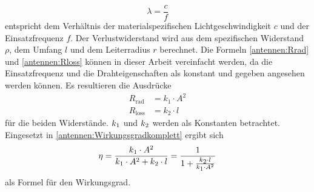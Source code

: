 \begin{equation}
	\lambda = \frac{c}{f}
	\label{antennen:lambda}
\end{equation}
entspricht dem Verhältnis der materialspezifischen Lichtgeschwindigkeit $c$ und der Einsatzfrequenz $f$.
Der Verlustwiderstand wird aus dem spezifischen Widerstand $\rho$, dem Umfang $l$ und dem Leiterradius $r$ berechnet. Die Formeln \eqref{antennen:Rrad} und \eqref{antennen:Rloss} können in dieser Arbeit vereinfacht werden, da die Einsatzfrequenz und die Drahteigenschaften als konstant und gegeben angesehen werden können. Es resultieren die Ausdrücke 
\begin{align}
	R_{\text{rad}} &= k_{\text{1}} \cdot A^2 \tag{20.6} \label{antennen:Rrad_konst} \\
	R_{\text{loss}} &= k_{\text{2}} \cdot l \tag{20.7} \label{antennen:Rloss_konst}
\end{align}
für die beiden Widerstände. $k\textsubscript{1}$ und $k\textsubscript{2}$ werden als Konstanten betrachtet. Eingesetzt in \eqref{antennen:Wirkungsgradkomplett} ergibt sich
\setcounter{equation}{7}
\begin{equation}
	\eta=\frac{k\textsubscript{1}\cdot{A^2}}{k\textsubscript{1}\cdot{A^2}+{k\textsubscript{2}\cdot{l}}}=\frac{1}{1+\frac{k\textsubscript{2}\cdot{l}}{k\textsubscript{1}\cdot{A^2}}}
	\label{antennen:Wirkungsgradeingesetzt}
\end{equation}
als Formel für den Wirkungsgrad.
